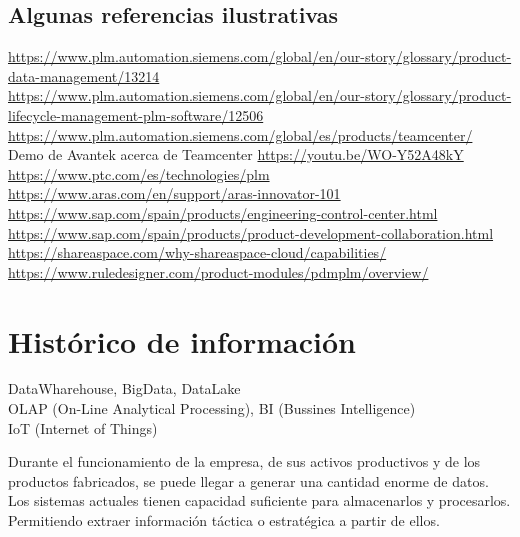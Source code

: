 \documentclass[spanish,12pt,a4paper,final,oneside]{book}
\begin{document}
\subsection*{Algunas referencias ilustrativas}
{\footnotesize \url{https://www.plm.automation.siemens.com/global/en/our-story/glossary/product-data-management/13214}}
{\footnotesize \\ \url{https://www.plm.automation.siemens.com/global/en/our-story/glossary/product-lifecycle-management-plm-software/12506}}
\\ \url{https://www.plm.automation.siemens.com/global/es/products/teamcenter/}
\\ Demo de Avantek acerca de Teamcenter \url{https://youtu.be/WO-Y52A48kY}
\\ \url{https://www.ptc.com/es/technologies/plm}
\\ \url{https://www.aras.com/en/support/aras-innovator-101}
\\ \url{https://www.sap.com/spain/products/engineering-control-center.html}
\\ \url{https://www.sap.com/spain/products/product-development-collaboration.html}
\\ \url{https://shareaspace.com/why-shareaspace-cloud/capabilities/}
\\ \url{https://www.ruledesigner.com/product-modules/pdmplm/overview/}


\section{Histórico de información} \label{DATA}
DataWharehouse, BigData, DataLake
\\OLAP (On-Line Analytical Processing), BI (Bussines Intelligence)
\\IoT (Internet of Things)

Durante el funcionamiento de la empresa, de sus activos productivos y de los productos fabricados, se puede llegar a generar una cantidad enorme de datos. Los sistemas actuales tienen capacidad suficiente para almacenarlos y procesarlos. Permitiendo extraer información táctica o estratégica a partir de ellos.
\end{document}
